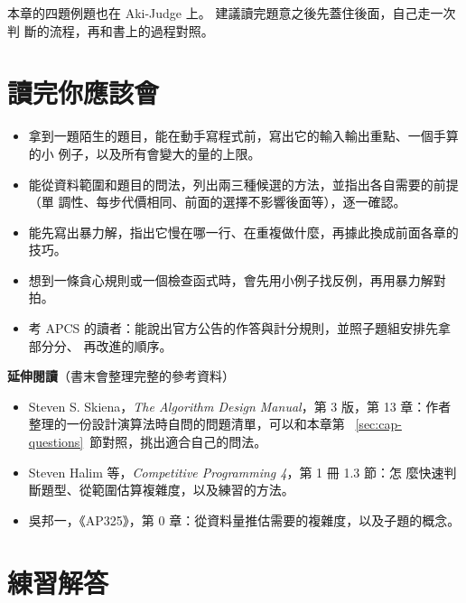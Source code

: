 本章的四題例題也在 Aki-Judge 上。 建議讀完題意之後先蓋住後面，自己走一次判
斷的流程，再和書上的過程對照。

\section{讀完你應該會}
\label{sec:cap-checklist}

\begin{itemize}
\item 拿到一題陌生的題目，能在動手寫程式前，寫出它的輸入輸出重點、一個手算的小
例子，以及所有會變大的量的上限。
\item 能從資料範圍和題目的問法，列出兩三種候選的方法，並指出各自需要的前提（單
調性、每步代價相同、前面的選擇不影響後面等），逐一確認。
\item 能先寫出暴力解，指出它慢在哪一行、在重複做什麼，再據此換成前面各章的技巧。
\item 想到一條貪心規則或一個檢查函式時，會先用小例子找反例，再用暴力解對拍。
\item 考 APCS 的讀者：能說出官方公告的作答與計分規則，並照子題組安排先拿部分分、
再改進的順序。
\end{itemize}

\textbf{延伸閱讀}（書末會整理完整的參考資料）

\begin{itemize}
\item Steven S. Skiena，\textit{The Algorithm Design Manual}，第 3 版，第 13
章：作者整理的一份設計演算法時自問的問題清單，可以和本章第
~\ref{sec:cap-questions}~節對照，挑出適合自己的問法。
\item Steven Halim 等，\textit{Competitive Programming 4}，第 1 冊 1.3 節：怎
麼快速判斷題型、從範圍估算複雜度，以及練習的方法。
\item 吳邦一，《AP325》，第 0 章：從資料量推估需要的複雜度，以及子題的概念。
\end{itemize}

\section*{練習解答}

